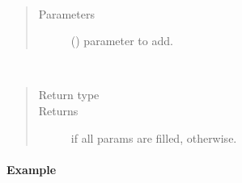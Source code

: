 \documentclass[letterpaper,10pt,english]{sphinxmanual}
\begin{document}
\begin{fulllineitems}
\begin{fulllineitems}
\label{\detokenize{matchzoo.engine:matchzoo.engine.param_table.ParamTable.add}}~\begin{quote}\begin{description}
\item[{Parameters}] \leavevmode
{} ({\hyperref[\detokenize{matchzoo.engine:matchzoo.engine.param.Param}]{}}) \textendash{} parameter to add.

\end{description}\end{quote}

\end{fulllineitems}


\begin{fulllineitems}
\label{\detokenize{matchzoo.engine:matchzoo.engine.param_table.ParamTable.completed}}~\begin{quote}\begin{description}
\item[{Return type}] \leavevmode
{}

\item[{Returns}] \leavevmode
{} if all params are filled,  otherwise.

\end{description}\end{quote}
\paragraph{Example}

%
\begin{sphinxVerbatim}[commandchars=\\\{\}]
 
  
\end{sphinxVerbatim}


\end{fulllineitems}
\end{fulllineitems}
\end{document}

